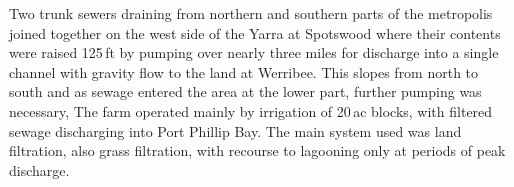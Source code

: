 Two trunk sewers draining from northern and southern parts of the
metropolis joined together on the west side of the Yarra at Spotswood
where their contents were raised 125\,ft by pumping over nearly three
miles for discharge into a single channel with gravity flow to the
land at Werribee.  This slopes from north to south and as sewage
entered the area at the lower part, further pumping was necessary, The
farm operated mainly by irrigation of 20\,ac blocks, with filtered
sewage discharging into Port Phillip Bay.  The main system used was
land filtration, also grass filtration, with recourse to lagooning
only at periods of peak discharge.


\theendnotes

